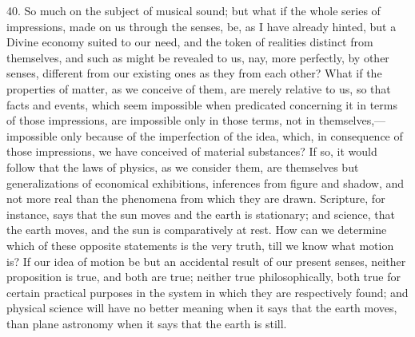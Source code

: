 40. So much on the subject of musical sound; but what if the whole
series of impressions, made on us through the senses, be, as I have
already hinted, but a Divine economy suited to our need, and the token
of realities distinct from themselves, and such as might be revealed
to us, nay, more perfectly, by other senses, different from our
existing ones as they from each other? What if the properties of
matter, as we conceive of them, are merely relative to us, so that
facts and events, which seem impossible when predicated concerning it
in terms of those impressions, are impossible only in those terms, not
in themselves,—impossible only because of the imperfection of the
idea, which, in consequence of those impressions, we have conceived of
material substances? If so, it would follow that the laws of physics,
as we consider them, are themselves but generalizations of economical
exhibitions, inferences from figure and shadow, and not more real than
the phenomena from which they are drawn. Scripture, for instance, says
that the sun moves and the earth is stationary; and science, that the
earth moves, and the sun is comparatively at rest. How can we
determine which of these opposite statements is the very truth, till
we know what motion is? If our idea of motion be but an accidental
result of our present senses, neither proposition is true, and both
are true; neither true philosophically, both true for certain
practical purposes in the system in which they are respectively found;
and physical science will have no better meaning when it says that the
earth moves, than plane astronomy when it says that the earth is
still.

